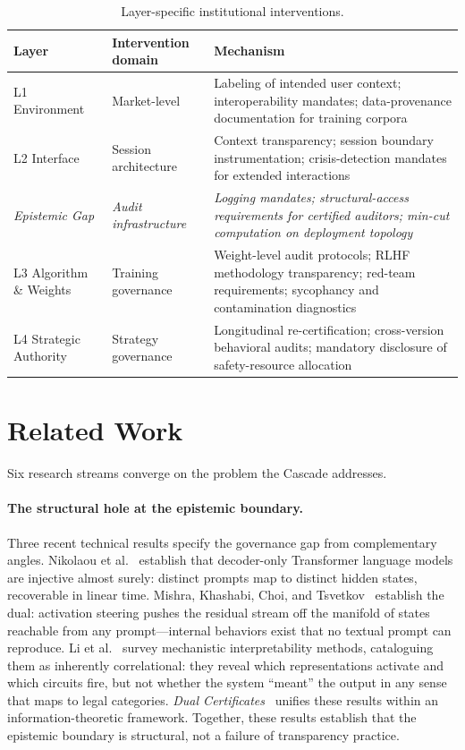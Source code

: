 \documentclass[11pt]{article}
\begin{document}
\begin{table}[!htbp]
\centering
\small
\caption{Layer-specific institutional interventions.}
\label{tab:interventions}
{\setlength{\tabcolsep}{4pt}
\begin{tabularx}{\columnwidth}{@{}P{1.8cm}P{2.7cm}Y@{}}
\toprule
\textbf{Layer} & \textbf{Intervention domain} & \textbf{Mechanism} \\
\midrule
L1 Environment & Market-level & Labeling of intended user context; interoperability mandates; data-provenance documentation for training corpora \\
L2 Interface & Session architecture & Context transparency; session boundary instrumentation; crisis-detection mandates for extended interactions \\
\textit{Epistemic Gap} & \textit{Audit infrastructure} & \textit{Logging mandates; structural-access requirements for certified auditors; min-cut computation on deployment topology} \\
L3 Algorithm \& Weights & Training governance & Weight-level audit protocols; RLHF methodology transparency; red-team requirements; sycophancy and contamination diagnostics \\
L4 Strategic Authority & Strategy governance & Longitudinal re-certification; cross-version behavioral audits; mandatory disclosure of safety-resource allocation \\
\bottomrule
\end{tabularx}}
\end{table}

\section{Related Work}\label{sec:related}

Six research streams converge on the problem the Cascade addresses.

\paragraph{The structural hole at the epistemic boundary.} Three recent technical results specify the governance gap from complementary angles. Nikolaou et al.~\cite{nikolaou2025injective} establish that decoder-only Transformer language models are injective almost surely: distinct prompts map to distinct hidden states, recoverable in linear time. Mishra, Khashabi, Choi, and Tsvetkov~\cite{mishra2026steered} establish the dual: activation steering pushes the residual stream off the manifold of states reachable from any prompt---internal behaviors exist that no textual prompt can reproduce. Li et al.~\cite{naseem2026mechanistic} survey mechanistic interpretability methods, cataloguing them as inherently correlational: they reveal which representations activate and which circuits fire, but not whether the system ``meant'' the output in any sense that maps to legal categories. \textit{Dual Certificates}~\cite{anon2026dual} unifies these results within an information-theoretic framework. Together, these results establish that the epistemic boundary is structural, not a failure of transparency practice.
\end{document}
